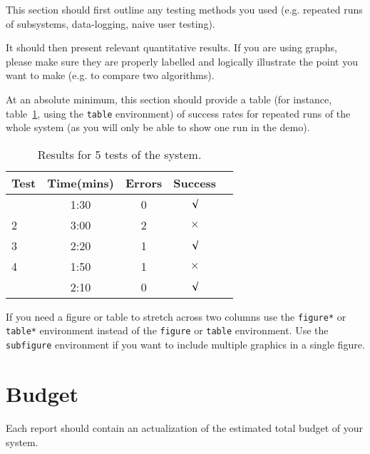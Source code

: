 \documentclass{article}
\begin{document}
This section should first outline any testing methods you used (e.g. repeated runs of subsystems, data-logging, naive user testing). 

It should then present relevant quantitative results. If you are using graphs, please make sure they are properly labelled and logically illustrate the point you want to make (e.g. to compare two algorithms).

At an absolute minimum, this section should provide a table (for instance, table~\ref{tab:sample-table}, using the \verb+table+ environment) of success rates for repeated runs of the whole system (as you will only be able to show one run in the demo).

\begin{table}[h]
\vskip 3mm
\begin{center}
\begin{small}
\begin{sc}
\begin{tabular}{lcccr}
\hline
\abovespace\belowspace
Test  & Time(mins) & Errors & Success \\
\hline
\abovespace
1    & 1:30 & 0 & $\surd$ \\
2    & 3:00 & 2 & $\times$\\
3    & 2:20 & 1 & $\surd$ \\
4    & 1:50 & 1 & $\times$\\
\belowspace
5    & 2:10 & 0 & $\surd$ \\
\hline
\end{tabular}
\end{sc}
\end{small}
\caption{Results for 5 tests of the system.}
\label{tab:sample-table}
\end{center}
\vskip -3mm
\end{table}

If you need a figure or table to stretch across two columns use the \verb+figure*+ or \verb+table*+ environment instead of the \verb+figure+ or \verb+table+ environment.  Use the \verb+subfigure+ environment if you want to include multiple graphics in a single figure.

\section{Budget}
Each report should contain an actualization of the estimated total budget 
of your system.








\end{document}
